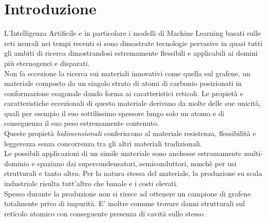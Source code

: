 \documentclass[12pt,a4paper,openright,twoside]{report}
\begin{document}
\chapter*{Introduzione}                 %
L'Intelligenza Artificile e in particolare i modelli di Machine Learning basati sulle reti neurali nei tempi recenti si sono dimostrate tecnologie pervasive in quasi tutti gli ambiti di ricerca dimostrandosi estremamente flessibili e applicabili ai domini più eternogenei e disparati. \\

Non fa eccezione la ricerca sui materiali innovativi come quella sul grafene, un materiale composto da un singolo strato di atomi di carbonio posizionati in conformazione esagonale dando forma ai caratteristici reticoli.
Le propietà e caratteristiche eccezionali di questo materiale derivano da molte delle sue unicità, quali per esempio il suo sottilissimo spessore lungo solo un atomo e di conseguenza il suo peso estremamente contenuto. \\
Queste propietà \emph{bidimensionali} conferiscono al materiale resistenza, flessibilità e leggerezza senza concorrenza tra gli altri materiali tradizionali. \\
Le possibili applicazioni di un simile materiale sono anchesse estramamente multi-dominio e spaziano dai supercondensatori, semiconduttori, nonchè per usi strutturali e tanto altro. 
Per la natura stessa del materiale, la produzione su scala industriale risulta tutt'altro che banale e i costi elevati. \\
Spesso durante la produzione non si riesce ad ottenere un campione di grafene totalmente privo di impurità. E' inoltre comune trovare danni strutturali sul reticolo atomico con conseguente presenza di cavità sullo stesso. \\
\end{document}
